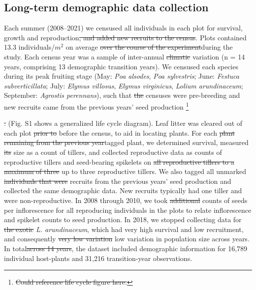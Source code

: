 \documentclass[lineno, sn-basic]{sn-jnl}%
\providecommand{\DIFadd}[1]{{\protect\color{blue}#1}} %
\providecommand{\DIFdel}[1]{{\protect\color{red}\protect\scriptsize\sout{#1}}}
\providecommand{\DIFadd}[1]{{\protect\color{blue}\uwave{#1}}} %
\providecommand{\DIFdel}[1]{{\protect\color{red}\sout{#1}}}                      %
\providecommand{\DIFaddbegin}{} %
\providecommand{\DIFaddend}{} %
\providecommand{\DIFdelbegin}{} %
\providecommand{\DIFdelend}{} %
\newcommand{\DIFscaledelfig}{0.5}
\newlength{\DIFdelgraphicswidth} %
\newlength{\DIFdelgraphicsheight} %
\newcommand{\DIFaddincludegraphics}[2][]{{\color{blue}\fbox{\DIFOincludegraphics[#1]{#2}}}} %
\newcommand{\DIFdelincludegraphics}[2][]{%
\sbox{\DIFdelgraphicsbox}{\DIFOincludegraphics[#1]{#2}}%
\settoboxwidth{\DIFdelgraphicswidth}{\DIFdelgraphicsbox} %
\settoboxtotalheight{\DIFdelgraphicsheight}{\DIFdelgraphicsbox} %
\scalebox{\DIFscaledelfig}{%
\parbox[b]{\DIFdelgraphicswidth}{\usebox{\DIFdelgraphicsbox}\\[-\baselineskip] \rule{\DIFdelgraphicswidth}{0em}}\llap{\resizebox{\DIFdelgraphicswidth}{\DIFdelgraphicsheight}{%
\setlength{\unitlength}{\DIFdelgraphicswidth}%
\begin{picture}(1,1)%
\thicklines\linethickness{2pt} %
{\color[rgb]{1,0,0}\put(0,0){\framebox(1,1){}}}%
{\color[rgb]{1,0,0}\put(0,0){\line( 1,1){1}}}%
{\color[rgb]{1,0,0}\put(0,1){\line(1,-1){1}}}%
\end{picture}%
}\hspace*{3pt}}} %
} %
\DeclareRobustCommand{\DIFaddbegin}{\DIFOaddbegin \let\includegraphics\DIFaddincludegraphics} %
\DeclareRobustCommand{\DIFaddend}{\DIFOaddend \let\includegraphics\DIFOincludegraphics} %
\DeclareRobustCommand{\DIFdelbegin}{\DIFOdelbegin \let\includegraphics\DIFdelincludegraphics} %
\DeclareRobustCommand{\DIFdelend}{\DIFOaddend \let\includegraphics\DIFOincludegraphics} %
\begin{document}
\subsection*{Long-term demographic data collection}
Each summer (2008--2021) we censused all individuals in each plot for survival, growth and reproduction\DIFdelbegin \DIFdel{, and added new recruits to the census}\DIFdelend .
Plots contained 13.3 individuals/$m^2$ on average \DIFdelbegin \DIFdel{over the course of the experiment}\DIFdelend \DIFaddbegin \DIFadd{during the study}\DIFaddend . 
Each census year was a sample of inter-annual \DIFdelbegin \DIFdel{climatic }\DIFdelend variation (n = 14 years, comprising 13 demographic transition years).
We censused each species during its peak fruiting stage (May: \emph{Poa alsodes}, \emph{Poa sylvestris}; June: \emph{Festuca subverticillata}; July: \emph{Elymus villosus}, \emph{Elymus virginicus}, \emph{Lolium arundinaceum}; September: \emph{Agrostis perennans}), such that \DIFdelbegin \DIFdel{the }\DIFdelend censuses were pre-breeding and new recruits came from the previous years' seed production \DIFdelbegin \footnote{\DIFdel{Could reference life cycle figure here.}}%
\addtocounter{footnote}{-1}%
\DIFdel{. }\DIFdelend \DIFaddbegin \DIFadd{(Fig. S1 shows a generalized life cycle diagram).
}\DIFaddend Leaf litter was cleared out of each plot \DIFdelbegin \DIFdel{prior to }\DIFdelend \DIFaddbegin \DIFadd{before }\DIFaddend the census, to aid in locating plants.
For each \DIFdelbegin \DIFdel{plant remaining from the previous year}\DIFdelend \DIFaddbegin \DIFadd{tagged plant}\DIFaddend , we determined survival, measured \DIFdelbegin \DIFdel{its }\DIFdelend size as a count of tillers, and collected reproductive data as counts of reproductive tillers and seed-bearing spikelets on \DIFdelbegin \DIFdel{all reproductive tillers to a maximum of three }\DIFdelend \DIFaddbegin \DIFadd{up to three reproductive tillers}\DIFaddend . 
We also tagged all unmarked \DIFdelbegin \DIFdel{individuals that were }\DIFdelend recruits from the previous years' seed production and collected the same demographic data. 
New recruits typically had one tiller and were non-reproductive. 
In 2008 through 2010, we took \DIFdelbegin \DIFdel{additional }\DIFdelend counts of seeds per inflorescence for all reproducing individuals in the plots to relate inflorescence and spikelet counts to seed production.
In 2018, we stopped collecting data for \DIFdelbegin \DIFdel{the exotic }\DIFdelend \emph{L. arundinaceum}, which had very high survival and low recruitment, and consequently \DIFdelbegin \DIFdel{very low variation }\DIFdelend \DIFaddbegin \DIFadd{low variation in population size }\DIFaddend across years.
In total\DIFdelbegin \DIFdel{across 14 years}\DIFdelend , the dataset included demographic information for 16,789 individual host-plants and 31,216 transition-year observations.
\end{document}
